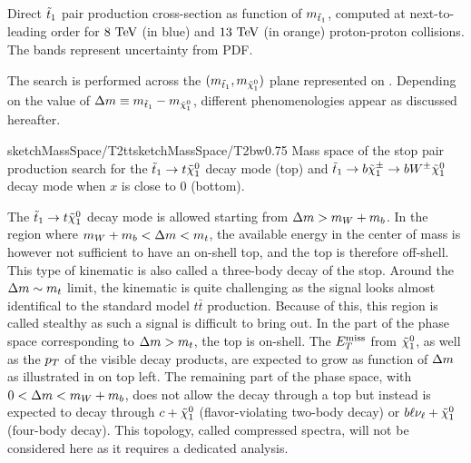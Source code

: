         {Direct $\tilde{t}_1$ pair production cross-section as function of $m_{\tilde{t}_1}$, computed at next-to-leading order
        for $8~\text{TeV}$ (in blue) and $13~\text{TeV}$ (in orange) proton-proton collisions. The bands represent uncertainty from PDF.}

        The search is performed across the $(m_{\tilde{t}_1},m_{\tilde{\chi}_1^0})$ plane
        represented on . Depending on the value of
        $\Delta m \equiv m_{\tilde{t}_1} - m_{\tilde{\chi}_1^0}$, different phenomenologies
        appear as discussed hereafter.

                     {sketchMassSpace/T2tt}{sketchMassSpace/T2bw}{0.75}
                     {Mass space of the stop pair production search for the $\tilde{t}_1
                     \rightarrow t \tilde{\chi}_1^0$ decay mode (top) and $\tilde{t}_1
                     \rightarrow b \tilde{\chi}_1^\pm \rightarrow b W^{\pm} \tilde{\chi}_1^0 $ decay
                     mode when $x$ is close to 0 (bottom).}

        The $\tilde{t}_1 \rightarrow t \tilde{\chi}_1^0$ decay mode is allowed starting from $\Delta m
        > m_{W} + m_{b}$. In the region where $m_{W} + m_{b} < \Delta m < m_{t}$,
        the available energy in the center of mass is however not sufficient to have an
        on-shell top, and the top is therefore off-shell. This type of kinematic is also
        called a three-body decay of the stop. Around the $\Delta m \sim m_{t}$ limit,
        the kinematic is quite challenging as the signal looks almost identifical to
        the standard model $t\bar{t}$ production. Because of this, this region is called
        stealthy as such a signal is difficult to bring out. In the part of the phase space
        corresponding to $\Delta m > m_{t}$, the top is on-shell. The $E_T^\text{miss}$ from $\tilde{\chi}_1^0$,
        as well as the $p_T$ of the visible decay products, are expected to grow as function of
        $\Delta m$ as illustrated in  on top left. The remaining
        part of the phase space, with $0 < \Delta m < m_{W} + m_{b}$, does not allow
        the decay through a top but instead is expected to decay through $c+\tilde{\chi}_1^0$
        (flavor-violating two-body decay) or $b\ell\nu_\ell+\tilde{\chi}_1^0$ (four-body decay).
        This topology, called compressed spectra, will not be considered here as it requires
        a dedicated analysis.

